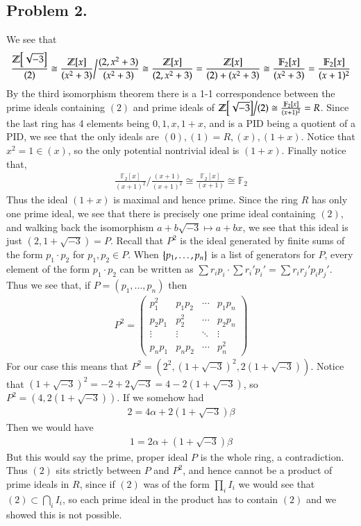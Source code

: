 \documentclass[12pt]{article}
\theoremstyle{definitionstyle}
\def\mbb#1{\mathbb{#1}}
\newcommand{\SET}[1]{\Set{\mskip-\medmuskip #1 \mskip-\medmuskip}}
\newcommand{\Z}{\mbb Z}
\newcommand{\F}{\mbb F}
\begin{document}
    \subsection*{Problem 2.}
    We see that
    \begin{align*}
        \frac{\Z\qty[\sqrt{-3}]}{(2)} \cong \frac{\Z[x]}{(x^2+3)} \bigg/ \frac{(2,x^2+3)}{(x^2+3)} \cong \frac{\Z[x]}{(2,x^2+3)} = \frac{\Z[x]}{(2)+(x^2+3)} \cong \frac{\F_2[x]}{(x^2+3)} = \frac{\F_2[x]}{(x+1)^2}
    \end{align*}
    By the third isomorphism theorem there is a 1-1 correspondence between the prime ideals containing $(2)$ and prime ideals of $\Z\qty[\sqrt{-3}]\big/(2) \cong \frac{\F_2[x]}{(x+1)^2} = R$. Since the last ring has 4 elements being $0,1,x,1+x$, and is a PID being a quotient of a PID, we see that the only ideals are $(0), (1) = R, (x), (1+x)$. Notice that $x^2 = 1 \in (x)$, so the only potential nontrivial ideal is $(1+x)$. Finally notice that,
    \begin{align*}
        \frac{\F_2[x]}{(x+1)^2} \bigg / \frac{(x+1)}{(x+1)^2} \cong \frac{\F_2[x]}{(x+1)} \cong \F_2
    \end{align*}
    Thus the ideal $(1+x)$ is maximal and hence prime. Since the ring $R$ has only one prime ideal, we see that there is precisely one prime ideal containing $(2)$, and walking back the isomorphism $a+b\sqrt{-3} \mapsto a+bx$, we see that this ideal is just $(2, 1+\sqrt{-3}) = P$. Recall that $P^2$ is the ideal generated by finite sums of the form $p_1 \cdot p_2$ for $p_1, p_2 \in P$. When $\SET{p_1, \ldots, p_n}$ is a list of generators for $P$, every element of the form $p_1 \cdot p_2$ can be written as $\sum r_i p_i \cdot \sum r_i' p_i' = \sum r_ir_j' p_i p_j'$. Thus we see that, if $P = (p_1, \ldots, p_n)$ then \begin{align*}
        P^2 = \begin{pmatrix}
            p_1^2 & p_1p_2 & \cdots & p_1p_n \\
            p_2p_1 & p_2^2 & \cdots & p_2p_n \\
            \vdots & \vdots & \ddots & \vdots \\
            p_np_1 & p_np_2 & \cdots & p_n^2
        \end{pmatrix}
    \end{align*}
    For our case this means that $P^2 = (2^2, (1+\sqrt{-3})^2 , 2(1+\sqrt{-3}))$. Notice that $(1+\sqrt{-3})^2 = -2 + 2\sqrt{-3} = 4 - 2(1+\sqrt{-3})$, so $P^2 = (4, 2(1+\sqrt{-3}))$. If we somehow had
    \begin{align*}
        2 = 4\alpha + 2(1+\sqrt{-3})\beta
    \end{align*}
    Then we would have
    \begin{align*}
        1 = 2\alpha + (1+\sqrt{-3})\beta
    \end{align*}
    But this would say the prime, proper ideal $P$ is the whole ring, a contradiction. Thus $(2)$ sits strictly between $P$ and $P^2$, and hence cannot be a product of prime ideals in $R$, since if $(2)$ was of the form $\prod_i I_i$ we would see that $(2) \subset \bigcap_i I_i$, so each prime ideal in the product has to contain $(2)$ and we showed this is not possible.
\end{document}
